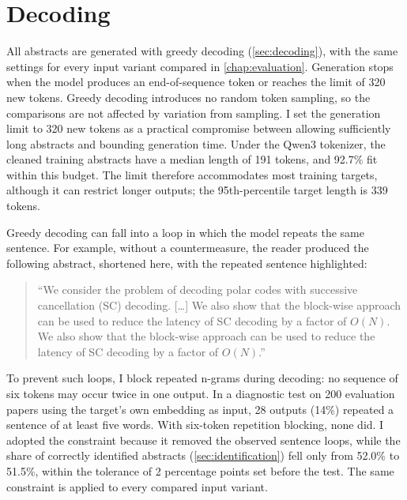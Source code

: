 \section{Decoding}
\label{sec:decoding-method}

All abstracts are generated with greedy decoding (\autoref{sec:decoding}), with the same settings for every input variant compared in \autoref{chap:evaluation}. Generation stops when the model produces an end-of-sequence token or reaches the limit of 320 new tokens. Greedy decoding introduces no random token sampling, so the comparisons are not affected by variation from sampling. I set the generation limit to 320 new tokens as a practical compromise between allowing sufficiently long abstracts and bounding generation time. Under the Qwen3 tokenizer, the cleaned training abstracts have a median length of 191 tokens, and 92.7\% fit within this budget. The limit therefore accommodates most training targets, although it can restrict longer outputs; the 95th-percentile target length is 339 tokens.

Greedy decoding can fall into a loop in which the model repeats the same sentence. For example, without a countermeasure, the reader produced the following abstract, shortened here, with the repeated sentence highlighted:
\begin{quote}
``We consider the problem of decoding polar codes with successive cancellation (SC) decoding. [\ldots] \textcolor[HTML]{0072B2}{We also show that the block-wise approach can be used to reduce the latency of SC decoding by a factor of $O(N)$.} \textcolor[HTML]{0072B2}{We also show that the block-wise approach can be used to reduce the latency of SC decoding by a factor of $O(N)$.}''
\end{quote}
To prevent such loops, I block repeated n-grams during decoding: no sequence of six tokens may occur twice in one output. In a diagnostic test on 200 evaluation papers using the target's own embedding as input, 28 outputs (14\%) repeated a sentence of at least five words. With six-token repetition blocking, none did. I adopted the constraint because it removed the observed sentence loops, while the share of correctly identified abstracts (\autoref{sec:identification}) fell only from 52.0\% to 51.5\%, within the tolerance of 2 percentage points set before the test. The same constraint is applied to every compared input variant.

